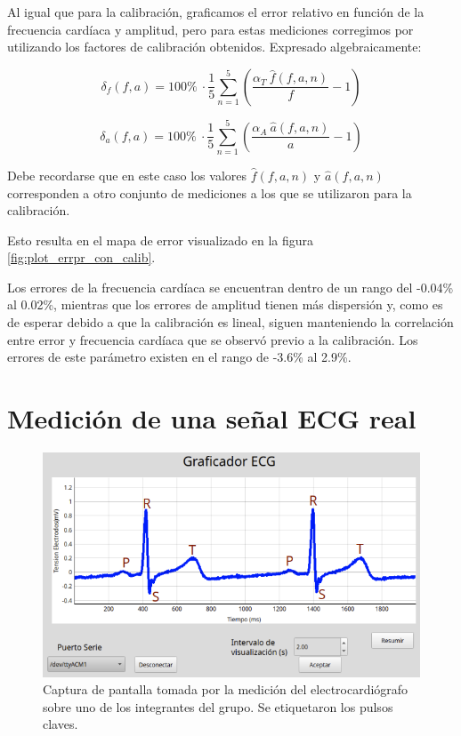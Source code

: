 \documentclass[conference]{IEEEtran}
\begin{document}
Al igual que para la calibración, graficamos el error relativo en función de 
la frecuencia cardíaca y amplitud, pero para estas mediciones corregimos por
utilizando los factores de calibración obtenidos. Expresado algebraicamente:

$$ \delta_{f} \left(f, a\right) = 100 \% ~ \cdot \dfrac{1}{5} \sum_{n=1}^{5}
\left( \dfrac{\alpha_T ~ \hat{f}(f,a,n)}{f} - 1\right)$$
 

$$ \delta_{a} \left(f, a\right) = 100 \% ~ \cdot \dfrac{1}{5} \sum_{n=1}^{5}
\left( \dfrac{\alpha_A ~ \hat{a}(f,a,n)}{a} - 1\right)$$

Debe recordarse que en este caso los valores $\hat{f}(f,a,n)$ y $\hat{a}(f,a,n)$
corresponden a otro conjunto de mediciones a los que se utilizaron para la
calibración.

Esto resulta en el mapa de error visualizado en la figura
\ref{fig:plot_errpr_con_calib}.

Los errores de la frecuencia cardíaca se encuentran dentro de un rango del
-0.04\% al 0.02\%, mientras que los errores de amplitud tienen más dispersión y,
como es de esperar debido a que la calibración es lineal, siguen manteniendo la
correlación entre error y frecuencia cardíaca que se observó previo a la
calibración. Los errores de este parámetro existen en el rango de -3.6\% al
2.9\%.
 
\section{Medición de una señal ECG real}



\begin{figure}[tb]
    \centering
    \includegraphics[width=\linewidth]{figs/graficador_ecg_etiquetado.png}
    \caption{Captura de pantalla tomada por la medición del electrocardiógrafo
    sobre  uno de los integrantes del grupo. Se etiquetaron los pulsos claves.}
    \label{fig:ecg_real}
\end{figure}
\end{document}

